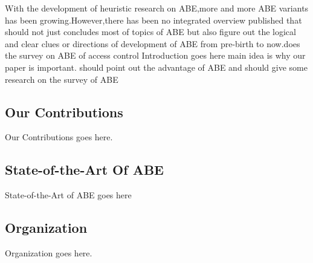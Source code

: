 With the development of heuristic research on ABE,more and more ABE variants has been growing.However,there has been no integrated overview published that should not just concludes most of topics of ABE but also figure out the logical and clear clues or directions of development of ABE from pre-birth to now.\cite{IE:survey}does the survey on ABE of access control
Introduction goes here
main idea is why our paper is important.
should point out the advantage of ABE
and should give some research on the survey of ABE
\subsection{Our Contributions}
Our Contributions goes here.
\subsection{State-of-the-Art Of ABE}
State-of-the-Art of ABE goes here
\subsection{Organization}
Organization goes here.
